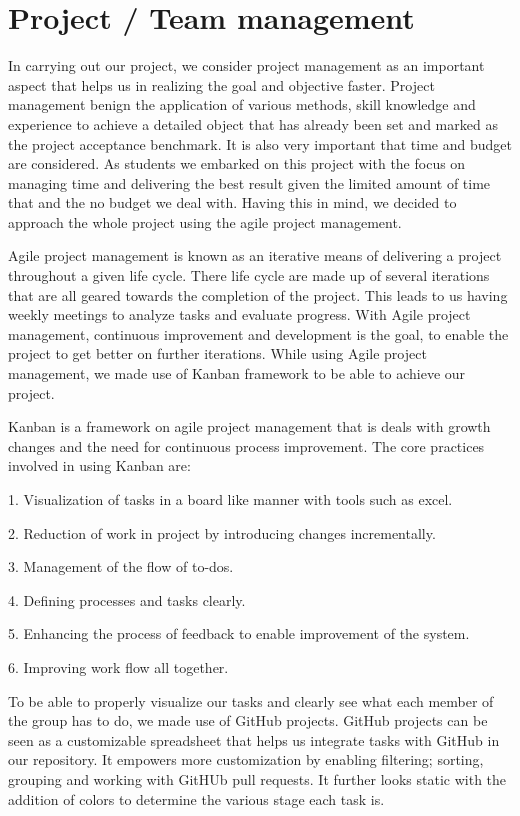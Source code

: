 \documentclass[12pt]{article}
\begin{document}
\section{Project / Team management}

In carrying out our project, we consider project management as an important aspect that helps us in realizing the goal and objective faster. Project management benign the application of various methods, skill knowledge and experience to achieve a detailed object that has already been set and marked as the project acceptance benchmark. It is also very important that time and budget are considered. As students we embarked on this project with the focus on managing time and delivering the best result given the limited amount of time that and the no budget we deal with.  Having this in mind, we decided to approach the whole project using the agile project management. 

Agile project management is known as an iterative means of delivering a project throughout a given life cycle. There life cycle are made up of several iterations that are all geared towards the completion of the project. This leads to us having weekly meetings to analyze tasks and evaluate progress. With Agile project management, continuous improvement and development is the goal, to enable the project to get better on further iterations. While using Agile project management, we made use of Kanban framework to be able to achieve our project. 

Kanban is a framework on agile project management that is deals with growth changes and the need for continuous process improvement. The core practices involved in using Kanban are: 

1.	Visualization of tasks in a board like manner with tools such as excel. 

2.	Reduction of work in project by introducing changes incrementally.

3.	Management of the flow of to-dos.

4.	Defining processes and tasks clearly.

5.	Enhancing the process of feedback to enable improvement of the system.

6.	Improving work flow all together. 

To be able to properly visualize our tasks and clearly see what each member of the group has to do, we made use of GitHub projects. GitHub projects can be seen as a customizable spreadsheet that helps us integrate tasks with GitHub in our repository. It empowers more customization by enabling filtering; sorting, grouping and working with GitHUb pull requests. It further looks static with the addition of colors to determine the various stage each task is. 
\end{document}
